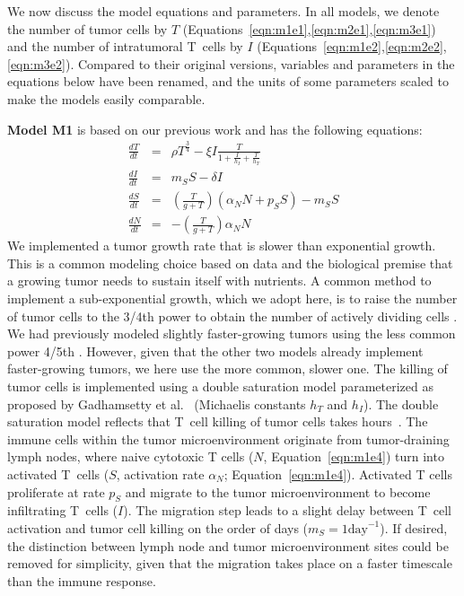\documentclass[a4paper,10pt]{article}
\begin{document}
We now discuss the model equations and parameters. In all models, we denote the number of tumor cells by $T$ 
(Equations~\ref{eqn:m1e1},\ref{eqn:m2e1},\ref{eqn:m3e1}) and the number
of intratumoral T~cells by $I$ (Equations~\ref{eqn:m1e2},\ref{eqn:m2e2},\ref{eqn:m3e2}). Compared to their 
original versions, variables and parameters in the equations below have been renamed, and the 
units of some parameters 
scaled to make the models easily comparable.

{\bfseries Model M1} is based on our previous work \cite{Creemers2021} and has the following equations:
\begin{eqnarray}
\frac{dT}{dt} & = & \rho T^\frac{3}{4} -  \xi I \frac{ T }{ 1 + \frac{I}{h_I} + \frac{T}{h_T} } \label{eqn:m1e1} \\
\frac{dI}{dt} & = & m_S S - \delta I \label{eqn:m1e2} \\
\frac{dS}{dt} & = & \left( \frac{T}{g+T} \right)(  \alpha_N N  + p_S S ) - m_S S \label{eqn:m1e3} \\
\frac{dN}{dt} & = & - \left( \frac{T}{g+T} \right) \alpha_N N  \label{eqn:m1e4}
\end{eqnarray}
We implemented a tumor growth rate
that is slower than exponential growth. This is a common modeling choice based on data and the biological 
premise that a growing tumor needs to sustain itself with nutrients. A common method to implement 
a sub-exponential growth, which we adopt here, is to raise the number of tumor cells to the 3/4th power to obtain
the number of actively dividing cells \cite{West2001}. We had previously modeled slightly faster-growing tumors 
using the less common power 4/5th \cite{Creemers2021}. However, given that the other two models
already implement faster-growing tumors, we here use the more common, slower one. The killing of tumor
cells is implemented using a double saturation model \cite{Borghans1996}
parameterized as proposed by Gadhamsetty et al.~\cite{Gadhamsetty2014} (Michaelis constants $h_T$ and $h_I$).
The double saturation model reflects 
that T~cell killing of tumor cells takes hours~\cite{Weigelin2021}. The immune cells within the 
tumor microenvironment originate from tumor-draining lymph nodes, where naive cytotoxic T cells ($N$, Equation~\ref{eqn:m1e4})
turn into activated T~cells ($S$, activation rate $\alpha_N$; Equation~\ref{eqn:m1e4}).  
Activated T cells proliferate at rate $p_S$ and migrate to the tumor microenvironment to become
infiltrating T~cells ($I$). 
{
The migration step leads to a slight delay between T~cell activation
and tumor cell killing on the order of days ($m_S=1 \textrm{day}^{-1}$).
If desired, the distinction between lymph node and tumor microenvironment sites could be removed 
for simplicity, given that the migration takes place on a faster timescale than the immune response.
}
\end{document}

